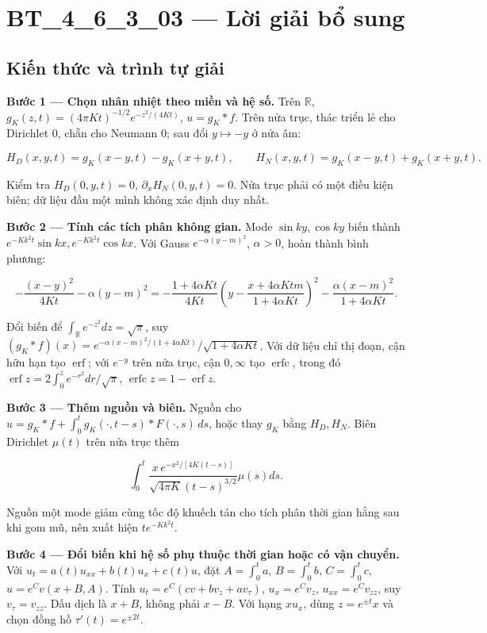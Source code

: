 \documentclass[10pt,a4paper]{article}
\begin{document}
\section*{BT\_4\_6\_3\_03 — Lời giải bổ sung}
\subsection*{Kiến thức và trình tự giải}
\textbf{Bước 1 — Chọn nhân nhiệt theo miền và hệ số.} Trên $\mathbb R$, $g_K(z,t)=(4\pi Kt)^{-1/2}e^{-z^2/(4Kt)}$, $u=g_K*f$. Trên nửa trục, thác triển lẻ cho Dirichlet $0$, chẵn cho Neumann $0$; sau đổi $y\mapsto-y$ ở nửa âm:


\[
H_D(x,y,t)=g_K(x-y,t)-g_K(x+y,t),\qquad
H_N(x,y,t)=g_K(x-y,t)+g_K(x+y,t).
\]


Kiểm tra $H_D(0,y,t)=0$, $\partial_xH_N(0,y,t)=0$. Nửa trục phải có một điều kiện biên; dữ liệu đầu một mình không xác định duy nhất.

\textbf{Bước 2 — Tính các tích phân không gian.} Mode $\sin ky,\cos ky$ biến thành $e^{-Kk^2t}\sin kx,e^{-Kk^2t}\cos kx$. Với Gauss $e^{-\alpha(y-m)^2}$, $\alpha>0$, hoàn thành bình phương:


\[
-\frac{(x-y)^2}{4Kt}-\alpha(y-m)^2
=-\frac{1+4\alpha Kt}{4Kt}\left(y-\frac{x+4\alpha Ktm}{1+4\alpha Kt}\right)^2
-\frac{\alpha(x-m)^2}{1+4\alpha Kt}.
\]


Đổi biến để $\int_{\mathbb R}e^{-z^2}dz=\sqrt\pi$, suy $(g_K*f)(x)=e^{-\alpha(x-m)^2/(1+4\alpha Kt)}/\sqrt{1+4\alpha Kt}$. Với dữ liệu chỉ thị đoạn, cận hữu hạn tạo $\operatorname{erf}$; với $e^{-y}$ trên nửa trục, cận $0,\infty$ tạo $\operatorname{erfc}$, trong đó $\operatorname{erf}z=2\int_0^ze^{-r^2}dr/\sqrt\pi$, $\operatorname{erfc}z=1-\operatorname{erf}z$.

\textbf{Bước 3 — Thêm nguồn và biên.} Nguồn cho $u=g_K*f+\int_0^tg_K(\cdot,t-s)*F(\cdot,s)\,ds$, hoặc thay $g_K$ bằng $H_D,H_N$. Biên Dirichlet $\mu(t)$ trên nửa trục thêm


\[
\int_0^t\frac{x\,e^{-x^2/[4K(t-s)]}}{\sqrt{4\pi K}(t-s)^{3/2}}\mu(s)ds.
\]


Nguồn một mode giảm cùng tốc độ khuếch tán cho tích phân thời gian hằng sau khi gom mũ, nên xuất hiện $te^{-Kk^2t}$.

\textbf{Bước 4 — Đổi biến khi hệ số phụ thuộc thời gian hoặc có vận chuyển.} Với $u_t=a(t)u_{xx}+b(t)u_x+c(t)u$, đặt $A=\int_0^ta$, $B=\int_0^tb$, $C=\int_0^tc$, $u=e^Cv(x+B,A)$. Tính $u_t=e^C(cv+bv_z+av_\tau)$, $u_x=e^Cv_z$, $u_{xx}=e^Cv_{zz}$, suy $v_\tau=v_{zz}$. Dấu dịch là $x+B$, không phải $x-B$. Với hạng $xu_x$, dùng $z=e^{\pm t}x$ và chọn đồng hồ $\tau'(t)=e^{\pm2t}$.
\end{document}
